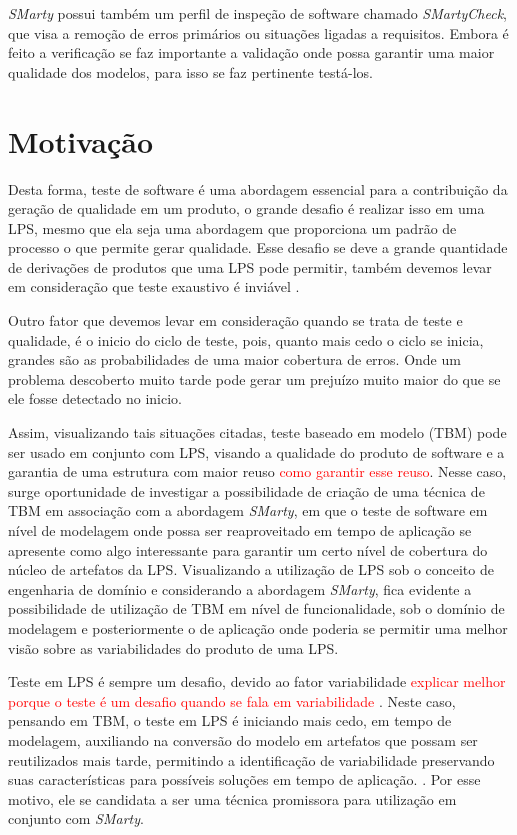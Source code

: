 \textit{SMarty} possui também um perfil de inspeção de software chamado \textit{SMartyCheck}, que visa a remoção de erros primários ou situações ligadas a requisitos. Embora é feito a verificação se faz importante a validação onde possa garantir uma maior qualidade dos modelos, para isso se faz pertinente testá-los.

\section{Motivação}
Desta forma, teste de software é uma abordagem essencial para a contribuição da geração de qualidade em um produto, o grande desafio é realizar isso em uma LPS, mesmo que ela seja uma abordagem que proporciona um padrão de processo o que permite gerar qualidade. Esse desafio se deve a grande quantidade de derivações de produtos que uma LPS pode permitir, também devemos levar em consideração que teste exaustivo é inviável \cite{do2014strategies}.

Outro fator que devemos levar em consideração quando se trata de teste e qualidade, é o inicio do ciclo de teste, pois, quanto mais cedo o ciclo se inicia, grandes são as probabilidades de uma maior cobertura de erros. Onde um problema descoberto muito tarde pode gerar um prejuízo muito maior do que se ele fosse detectado no inicio.

Assim, visualizando tais situações citadas, teste baseado em modelo (TBM) pode ser usado em conjunto com LPS, visando a qualidade do produto de software e a garantia de uma estrutura com maior reuso \textcolor{red}{como garantir esse reuso}. Nesse caso, surge oportunidade de investigar a possibilidade de criação de uma técnica de TBM em associação com a abordagem \textit{SMarty}, em que o teste de software em nível de modelagem onde possa ser reaproveitado em tempo de aplicação se apresente como algo interessante para garantir um certo nível de cobertura do núcleo de artefatos da LPS. Visualizando a utilização de LPS sob o conceito de engenharia de domínio e considerando a abordagem \textit{SMarty}, fica evidente a possibilidade de utilização de TBM em nível de funcionalidade, sob o domínio de modelagem e posteriormente o de aplicação onde poderia se permitir uma melhor visão sobre as variabilidades do produto de uma LPS.

Teste em LPS é sempre um desafio, devido ao fator variabilidade \textcolor{red}{explicar melhor porque o teste é um desafio quando se fala em variabilidade} \cite{chen2009variability,engstrom2011software,chen2011systematic,do2014strategies}. Neste caso, pensando em TBM, o teste em LPS é iniciando mais cedo, em tempo de modelagem, auxiliando na conversão do modelo em artefatos que possam ser reutilizados mais tarde, permitindo a identificação de variabilidade preservando suas características para possíveis soluções em tempo de aplicação. \cite{lamancha2010model,reales2011model,lamancha2009automated}. Por esse motivo, ele se candidata a ser uma técnica promissora para utilização em conjunto com \textit{SMarty}.

